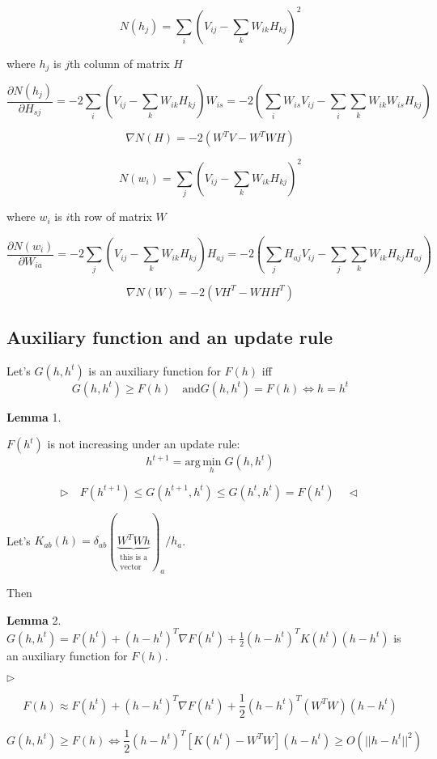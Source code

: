 \documentclass{extreport}
\begin{document}
\[
  N(h_j) = \sum_{i}
  \left(
    V_{ij} - \sum_{k}W_{ik}H_{kj}
  \right)^2
\]

where $h_j$ is $j$th column of matrix $H$

\[
  \frac{\partial N(h_j)}{\partial H_{sj}} =
  -2 \sum_i
    \left(
      V_{ij} - \sum_k W_{ik}H_{kj}
    \right)
  W_{is} =
  -2
    \left(
      \sum_i W_{is}V_{ij} - \sum_i\sum_kW_{ik}W_{is}H_{kj}
    \right)
\]

\[
  \nabla N(H) = -2 ( W^TV - W^TWH )
\]

\[
  N(w_i) = \sum_j \left( V_{ij} - \sum_k W_{ik}H_{kj} \right)^2
\]

where $w_i$ is $i$th row of matrix $W$

\[
  \frac{\partial N(w_i)}{\partial W_{ia}} =
  -2 \sum_j
    \left(
      V_{ij} - \sum_k W_{ik}H_{kj}
    \right)
  H_{aj} =
  -2
    \left(
      \sum_j H_{aj}V_{ij} - \sum_j \sum_k W_{ik}H_{kj}H_{aj}
    \right)
\]

\[
  \nabla N(W) = -2 ( VH^T - WHH^T )
\]

\subsection{Auxiliary function and an update rule}

Let's $G(h, h^t)$ is an auxiliary function for $F(h)$ iff
\[
  G(h,h^t) \geqslant F(h) \quad \text{and}
  G(h,h^t) = F(h) \iff h = h^t
\]

\textbf{Lemma} 1.

$F(h^t)$ is not increasing under an update rule:
\[
  h^{t+1} = \text{arg} \, \underset{h}{\text{min}} \; G(h,h^t)
\]

\[
  \rhd \quad
    F(h^{t+1}) \leqslant G(h^{t+1},h^t) \leqslant G(h^t,h^t) = F(h^t) \quad
  \lhd
\]

Let's $K_{ab}(h) =
  \delta_{ab}
  (\underbrace{W^T W h}_{\substack{\text{this is a}\\ \text{vector}}})_a
  / h_a$.

Then

\textbf{Lemma} 2.
$G(h,h^t) = F(h^t) + (h - h^t)^T \nabla F(h^t)
  + \frac{1}{2} (h - h^t)^T K(h^t) (h - h^t)$
is an auxiliary function for $F(h)$.

$\rhd$

$$F(h) \approx F(h^t) + (h - h^t)^T \nabla F(h^t)
  + \frac{1}{2} (h - h^t)^T (W^TW) (h - h^t)$$

$$G(h,h^t) \geqslant F(h) \iff
\frac{1}{2} (h - h^t)^T \left[K(h^t) - W^TW\right] (h - h^t)
\geqslant O(||h - h^t||^2)$$
\end{document}
